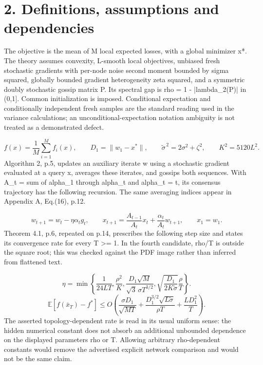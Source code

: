 \documentclass[10pt]{article}
\begin{document}
\section*{2. Definitions, assumptions and dependencies}
The objective is the mean of M local expected losses, with a global minimizer x*. The theory assumes convexity, L-smooth local objectives, unbiased fresh stochastic gradients with per-node noise second moment bounded by sigma squared, globally bounded gradient heterogeneity zeta squared, and a symmetric doubly stochastic gossip matrix P. Its spectral gap is rho = 1 - |lambda\_2(P)| in (0,1]. Common initialization is imposed. Conditional expectation and conditionally independent fresh samples are the standard reading used in the variance calculations; an unconditional-expectation notation ambiguity is not treated as a demonstrated defect.\par
\[f(x)=\frac1M\sum_{i=1}^{M}f_i(x),\qquad
D_1=\|w_1-x^*\|,\qquad
\widetilde{\sigma}^{\,2}=2\sigma^2+\zeta^2,\qquad K^2=5120L^2.\] Algorithm 2, p.5, updates an auxiliary iterate w using a stochastic gradient evaluated at a query x, averages these iterates, and gossips both sequences. With A\_t = sum of alpha\_1 through alpha\_t and alpha\_t = t, its consensus trajectory has the following recursion. The same averaging indices appear in Appendix A, Eq.(16), p.12.\par
\[w_{t+1}=w_t-\eta\alpha_tg_t,\qquad
x_{t+1}=\frac{A_{t-1}}{A_t}x_t+\frac{\alpha_t}{A_t}w_{t+1},
\qquad x_1=w_1.\] Theorem 4.1, p.6, repeated on p.14, prescribes the following step size and states its convergence rate for every T >= 1. In the fourth candidate, rho/T is outside the square root; this was checked against the PDF image rather than inferred from flattened text.\par
\[\eta=\min\left\{\frac1{24LT},\frac{\rho^2}{K},
\frac{D_1\sqrt M}{\sqrt3\,\sigma T^{3/2}},
\sqrt{\frac{D_1}{2K\widetilde{\sigma}}}\frac{\rho}{T}\right\}.\] \[\mathbb E[f(\bar x_T)-f^*]\le
O\!\left(\frac{\sigma D_1}{\sqrt{MT}}+
\frac{D_1^{3/2}\sqrt{L\widetilde{\sigma}}}{\rho T}
+\frac{LD_1^2}{T}\right).\] The asserted topology-dependent rate is read in its usual uniform sense: the hidden numerical constant does not absorb an additional unbounded dependence on the displayed parameters rho or T. Allowing arbitrary rho-dependent constants would remove the advertised explicit network comparison and would not be the same claim.\par
\end{document}
